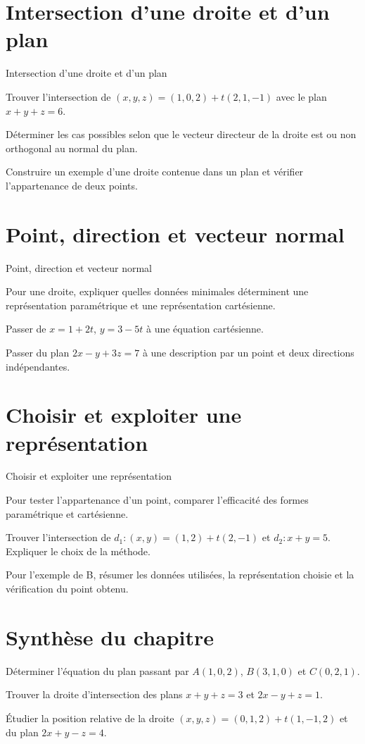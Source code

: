 \section{Intersection d'une droite et d'un plan}
\label{workbook:section:10.05}
\begin{exerciseblock}{Intersection d'une droite et d'un plan}
\item Trouver l'intersection de $(x,y,z)=(1,0,2)+t(2,1,-1)$ avec le plan $x+y+z=6$.
\item Déterminer les cas possibles selon que le vecteur directeur de la droite est ou non orthogonal au normal du plan.
\item Construire un exemple d'une droite contenue dans un plan et vérifier l'appartenance de deux points.
\end{exerciseblock}
\section{Point, direction et vecteur normal}
\label{workbook:section:10.06}
\begin{exerciseblock}{Point, direction et vecteur normal}
\item Pour une droite, expliquer quelles données minimales déterminent une représentation paramétrique et une représentation cartésienne.
\item Passer de $x=1+2t$, $y=3-5t$ à une équation cartésienne.
\item Passer du plan $2x-y+3z=7$ à une description par un point et deux directions indépendantes.
\end{exerciseblock}
\section{Choisir et exploiter une représentation}
\label{workbook:section:10.07}
\begin{exerciseblock}{Choisir et exploiter une représentation}
\item Pour tester l'appartenance d'un point, comparer l'efficacité des formes paramétrique et cartésienne.
\item Trouver l'intersection de $d_1:(x,y)=(1,2)+t(2,-1)$ et $d_2:x+y=5$. Expliquer le choix de la méthode.
\item Pour l'exemple de B, résumer les données utilisées, la représentation choisie et la vérification du point obtenu.
\end{exerciseblock}
\section*{Synthèse du chapitre}
\begin{synthesisbox}
\item Déterminer l'équation du plan passant par $A(1,0,2)$, $B(3,1,0)$ et $C(0,2,1)$.
\item Trouver la droite d'intersection des plans $x+y+z=3$ et $2x-y+z=1$.
\item Étudier la position relative de la droite $(x,y,z)=(0,1,2)+t(1,-1,2)$ et du plan $2x+y-z=4$.
\end{synthesisbox}
